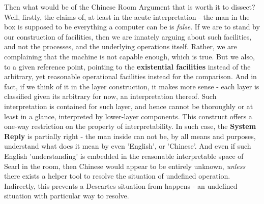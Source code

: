 Then what would be of the Chinese Room Argument that is worth it to dissect? Well, firstly, the claims of, at least in the acute interpretation - the man in the box is supposed to be everything a computer can be is \textit{false}. If we are to stand by our construction of facilities, then we are innately arguing about such facilities, and not the processes, and the underlying operations itself. Rather, we are complaining that the machine is not capable enough, which is true. But we also, to a given reference point, pointing to the \textbf{existential facilities} instead of the arbitrary, yet reasonable operational facilities instead for the comparison. And in fact, if we think of it in the layer construction, it makes more sense - each layer is classified given its arbitrary for now, an interpretation thereof. Such interpretation is contained for such layer, and hence cannot be thoroughly or at least in a glance, interpreted by lower-layer components. This construct offers a one-way restriction on the property of interpretability. In such case, the \textbf{System Reply} is partially right - the man inside can not be, by all means and purposes, understand what does it mean by even 'English', or 'Chinese'. And even if such English 'understanding' is embedded in the reasonable interpretable space of Searl in the room, then Chinese would appear to be entirely unknown, \textit{unless} there exists a helper tool to resolve the situation of undefined operation. Indirectly, this prevents a Descartes situation from happens - an undefined situation with particular way to resolve.

